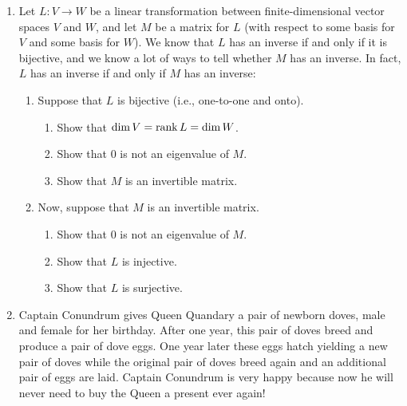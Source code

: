 \begin{enumerate}
\begin{enumerate}
\end{enumerate}

\item Let \(L \colon V \to W\) be a linear transformation between finite-dimensional vector spaces \(V\) and \(W\), and let \(M\) be a matrix for \(L\) (with respect to some basis for \(V\) and some basis for \(W\)). We know that \(L\) has an inverse if and only if it is bijective, and we know a lot of ways to tell whether \(M\) has an inverse. In fact, \(L\) has an inverse if and only if \(M\) has an inverse:
\begin{enumerate}
\item Suppose that \(L\) is bijective (i.e., one-to-one and onto).
\begin{enumerate}
\item Show that \(\operatorname{dim} V=\operatorname{rank} L=\operatorname{dim} W\).
\item Show that \(0\) is not an eigenvalue of \(M\).
\item Show that \(M\) is an invertible matrix. 
\end{enumerate}
\item Now, suppose that \(M\) is an invertible matrix.
\begin{enumerate}
\item Show that \(0\) is not an eigenvalue of \(M\).
\item Show that \(L\) is injective.
\item Show that \(L\) is surjective.
\end{enumerate}
\end{enumerate}

\item Captain Conundrum gives Queen Quandary a pair of newborn doves, male and female for her birthday. After one year, this pair of doves breed and produce a pair of dove eggs. One year later these eggs hatch yielding a new pair of doves while the original pair of doves breed again and an additional pair of eggs are laid.  Captain Conundrum is
very happy because now he will never need to buy the Queen a present ever again! 


\end{enumerate}

